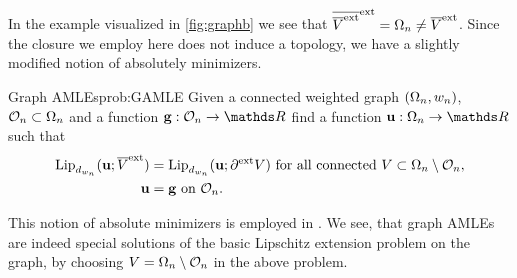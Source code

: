%
\noindent%
In the example visualized in \cref{fig:graphb} we see that $\overline{\overline{V}^{\text{ext}}}^{\text{ext}}=\Omega_n\neq \overline{V}^{\text{ext}}$. Since the closure we employ here does not induce a topology, we have a slightly modified notion of absolutely minimizers.
%
\begin{problem}{Graph AMLEs}{prob:GAMLE}
Given a connected weighted graph $(\Omega_n, w_n)$, $\mathcal{O}_n\subset\Omega_n$ and a function $\vec g:\conset_n\to\R$ find a function $\vec u:\domain_n\to\R$ such that
%
\begin{align*}
\operatorname{Lip}_{d_{w_n}}(\mathbf{u}; \overline{V}^{\text{ext}}) &= \operatorname{Lip}_{d_{w_n}}(\mathbf{u}; \partial^{\text{ext}} V)
\text{ for all connected } V\subset \Omega_n\setminus\mathcal{O}_n,\\
\mathbf{u} &= \mathbf{g}\text{ on } \mathcal{O}_n.
\end{align*}
\end{problem}
%
\noindent%
This notion of absolute minimizers is employed in \cite{bungert2021uniform, bungert2022ratio}.  We see, that graph AMLEs are indeed special solutions of the basic Lipschitz extension problem on the graph, by choosing $V=\Omega_n\setminus\mathcal{O}_n$ in the above problem.
%
%
%
